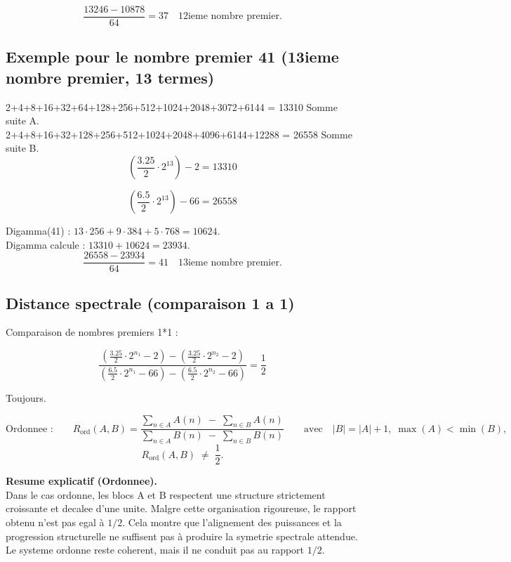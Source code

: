 \documentclass[a4paper,11pt]{article}
\begin{document}
\[
\frac{13246 - 10878}{64} = 37 \quad \text{12ieme nombre premier.}
\]

\bigskip

\subsection*{Exemple pour le nombre premier 41 (13ieme nombre premier, 13 termes)}

2+4+8+16+32+64+128+256+512+1024+2048+3072+6144 = 13310 Somme suite A.\\
2+4+8+16+32+128+256+512+1024+2048+4096+6144+12288 = 26558 Somme suite B.\\

\[
\left(\frac{3.25}{2} \cdot 2^{13}\right) - 2 = 13310
\]

\[
\left(\frac{6.5}{2} \cdot 2^{13}\right) - 66 = 26558
\]

Digamma(41) : \(13 \cdot 256 + 9 \cdot 384 + 5 \cdot 768 = 10624\).\\
Digamma calcule : \(13310 + 10624 = 23934\).\\

\[
\frac{26558 - 23934}{64} = 41 \quad \text{13ieme nombre premier.}
\]

\bigskip

\subsection*{Distance spectrale (comparaison 1 a 1)}

Comparaison de nombres premiers 1*1 :

\[
\frac{
\left(\frac{3.25}{2} \cdot 2^{n_{1}} - 2\right)
-
\left(\frac{3.25}{2} \cdot 2^{n_{2}} - 2\right)
}{
\left(\frac{6.5}{2} \cdot 2^{n_{1}} - 66\right)
-
\left(\frac{6.5}{2} \cdot 2^{n_{2}} - 66\right)
}
= \frac{1}{2}
\]

Toujours.

\[
\text{Ordonnee :}\qquad
R_{\mathrm{ord}}(A,B)
=
\frac{\displaystyle \sum_{n \in A} A(n)\;-\;\sum_{n \in B} A(n)}
     {\displaystyle \sum_{n \in A} B(n)\;-\;\sum_{n \in B} B(n)}
\qquad\text{avec}\quad |B| = |A| + 1,\; \max(A) < \min(B),
\]
\[
R_{\mathrm{ord}}(A,B) \;\neq\; \frac{1}{2}.
\]

\textbf{Resume explicatif (Ordonnee).} \\
Dans le cas ordonne, les blocs A et B respectent une structure strictement croissante
et decalee d'une unite. Malgre cette organisation rigoureuse, le rapport obtenu n'est
pas egal à $1/2$. Cela montre que l'alignement des puissances et la progression
structurelle ne suffisent pas à produire la symetrie spectrale attendue. Le systeme
ordonne reste coherent, mais il ne conduit pas au rapport $1/2$.
\end{document}

